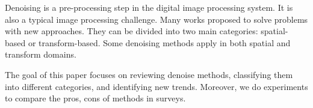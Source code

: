 Denoising is a pre-processing step in the digital image processing system. It is also a typical image processing challenge. Many works proposed to solve problems with new approaches. They can be divided into two main categories: spatial-based or transform-based. Some denoising methods apply in both spatial and transform domains. 

The goal of this paper focuses on reviewing denoise methods, classifying them into different categories, and identifying new trends. Moreover, we do experiments to compare the pros, cons of methods in surveys.